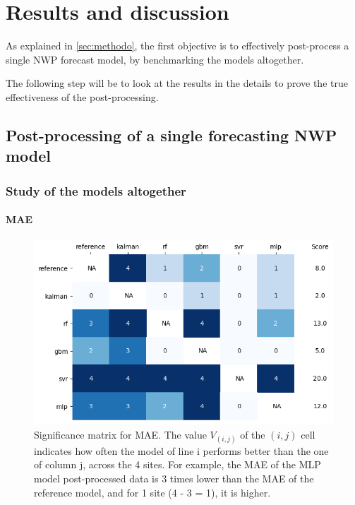 \section{Results and discussion}

As explained in \ref{sec:methodo}, the first objective is to effectively post-process a single NWP forecast model, by benchmarking the models altogether. 

The following step will be to look at the results in the details to prove the true effectiveness of the post-processing.
\subsection{Post-processing of a single forecasting NWP model}
\subsubsection{Study of the models altogether} 
\paragraph{MAE}
\begin{figure}[htb!]
    \centering
    \includegraphics[width=\textwidth]{figures/first_study/significance_matrix_mae.png}
\caption{Significance matrix for MAE. The value $V_{(i,j)}$ of the $(i,j)$ cell indicates how often the model of line i performs better than the one of column j, across the 
4 sites. For example, the MAE of the MLP model post-processed data is 3 times lower than the MAE of the reference model, and for 1 site (4 - 3 = 1), it is higher.}
\end{figure}

